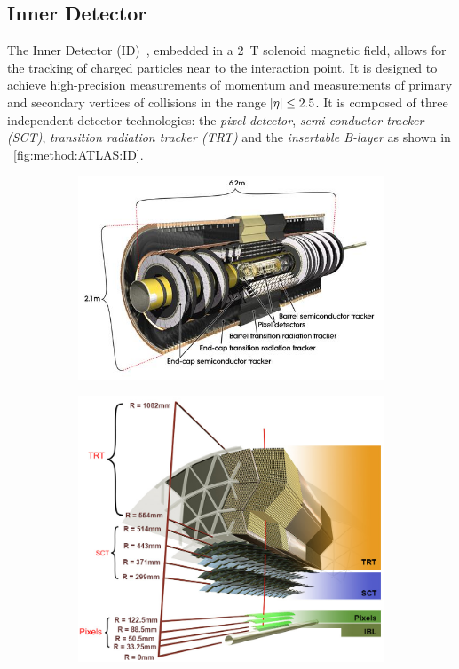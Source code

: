 \subsection{Inner Detector}\label{sec:method:ID}
The Inner Detector (ID)~\cite{ATLAS:ID-TDR}, embedded in a \SI{2}{\tesla} solenoid magnetic field, allows for the tracking of charged particles near to the interaction point. It is designed to achieve high-precision measurements of momentum and measurements of primary and secondary vertices of collisions in the range $\abs{\eta} \leq 2.5$. It is composed of three independent detector technologies: the \emph{pixel detector}, \emph{semi-conductor tracker (SCT)}, \emph{transition radiation tracker (TRT)} and the \emph{insertable B-layer} as shown in ~\cref{fig:method:ATLAS:ID}. 
\begin{figure}[!htpb]
    \centering
    \begin{subfigure}[b]{0.49\textwidth}
        \centering
        \includegraphics[width=\textwidth]{images/ATLAS_ID_no_IBL}
        \label{fig:ID1}
    \end{subfigure}
    \begin{subfigure}[b]{0.49\textwidth}
        \centering
        \includegraphics[width=\textwidth]{images/ID_withIBL}

\end{subfigure}
\end{figure}
